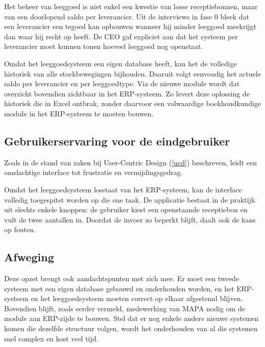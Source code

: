 Het beheer van leeggoed is niet enkel een kwestie van losse receptiebonnen, maar van een doorlopend saldo per leverancier. Uit de interviews in fase 0 bleek dat een leverancier een tegoed kan opbouwen wanneer hij minder leeggoed meekrijgt dan waar hij recht op heeft. De CEO gaf expliciet aan dat het systeem per leverancier moet kunnen tonen hoeveel leeggoed nog openstaat.

Omdat het leeggoedsysteem een eigen database heeft, kan het de volledige historiek van alle stockbewegingen bijhouden. Daaruit volgt eenvoudig het actuele saldo per leverancier en per leeggoedtype. Via de nieuwe module wordt dat overzicht bovendien zichtbaar in het ERP-systeem. Zo levert deze oplossing de historiek die in Excel ontbrak, zonder daarvoor een volwaardige boekhoudkundige module in het ERP-systeem te moeten bouwen.

\subsection{Gebruikerservaring voor de eindgebruiker}

Zoals in de stand van zaken bij User-Centric Design (\ref{ucd}) beschreven, leidt een omslachtige interface tot frustratie en vermijdingsgedrag.

Omdat het leeggoedsysteem losstaat van het ERP-systeem, kan de interface volledig toegespitst worden op die ene taak. De applicatie bestaat in de praktijk uit slechts enkele knoppen: de gebruiker kiest een openstaande receptiebon en vult de twee aantallen in. Doordat de invoer zo beperkt blijft, daalt ook de kans op fouten.

\subsection{Afweging}

Deze opzet brengt ook aandachtspunten met zich mee. Er moet een tweede systeem met een eigen database gebouwd en onderhouden worden, en het ERP-systeem en het leeggoedsysteem moeten correct op elkaar afgestemd blijven. Bovendien blijft, zoals eerder vermeld, medewerking van MAPA nodig om de module aan ERP-zijde te bouwen. Stel dat er nog enkele andere nieuwe systemen komen die dezelfde structuur volgen, wordt het onderhouden van al die systemen snel complex en kost veel tijd.